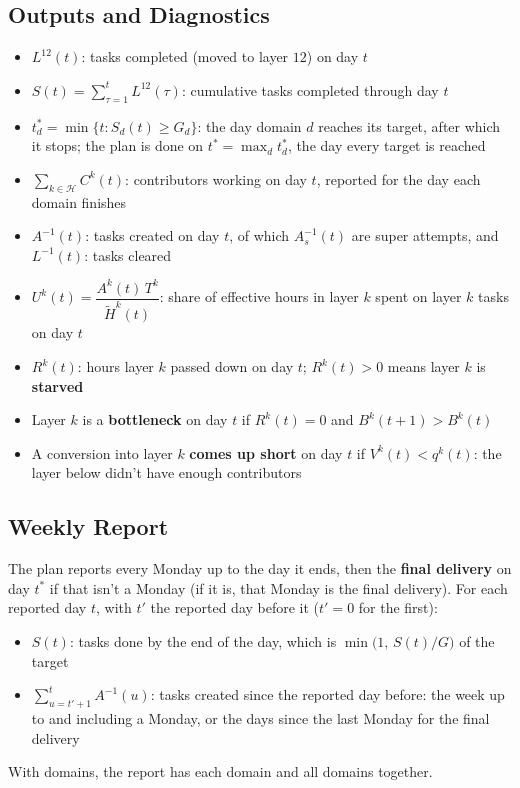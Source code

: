 \documentclass{article}
\begin{document}
\subsection*{Outputs and Diagnostics}
\begin{itemize}
  \item $L^{12}(t)$: tasks completed (moved to layer $12$) on day $t$

  \item $S(t) = \displaystyle\sum_{\tau=1}^{t} L^{12}(\tau)$: cumulative tasks completed through day $t$

  \item $t^*_d = \min\{t : S_d(t) \ge G_d\}$: the day domain $d$ reaches its target, after which it stops; the plan is done on $t^* = \max_d t^*_d$, the day every target is reached

  \item $\sum_{k \in \mathcal{H}} C^k(t)$: contributors working on day $t$, reported for the day each domain finishes

  \item $A^{-1}(t)$: tasks created on day $t$, of which $A^{-1}_s(t)$ are super attempts, and $L^{-1}(t)$: tasks cleared

  \item $U^k(t) = \dfrac{A^k(t)\, T^k}{\tilde{H}^k(t)}$: share of effective hours in layer $k$ spent on layer $k$ tasks on day $t$

  \item $R^k(t)$: hours layer $k$ passed down on day $t$; $R^k(t) > 0$ means layer $k$ is \textbf{starved}

  \item Layer $k$ is a \textbf{bottleneck} on day $t$ if $R^k(t) = 0$ and $B^k(t+1) > B^k(t)$

  \item A conversion into layer $k$ \textbf{comes up short} on day $t$ if $V^k(t) < q^k(t)$: the layer below didn't have enough contributors
\end{itemize}

\subsection*{Weekly Report}
The plan reports every Monday up to the day it ends, then the \textbf{final delivery} on day $t^*$ if that isn't a Monday (if it is, that Monday is the final delivery). For each reported day $t$, with $t'$ the reported day before it ($t' = 0$ for the first):
\begin{itemize}
  \item $S(t)$: tasks done by the end of the day, which is $\min\bigl(1,\, S(t)/G\bigr)$ of the target

  \item $\sum_{u = t'+1}^{t} A^{-1}(u)$: tasks created since the reported day before: the week up to and including a Monday, or the days since the last Monday for the final delivery
\end{itemize}
With domains, the report has each domain and all domains together.
\end{document}
